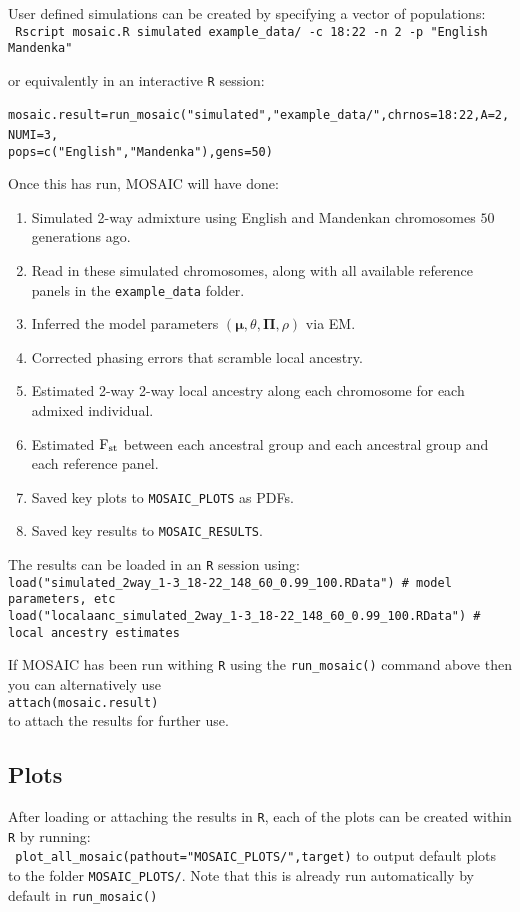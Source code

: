 \documentclass{article}
\begin{document}
User defined simulations can be created by specifying a vector of populations:\\
\verb+ Rscript mosaic.R simulated example_data/ -c 18:22 -n 2 -p "English Mandenka"+

or equivalently in an interactive \texttt{R} session:\\
\verb+ mosaic.result=run_mosaic("simulated","example_data/",chrnos=18:22,A=2,NUMI=3,+
\verb+                                pops=c("English","Mandenka"),gens=50) +

Once this has run, MOSAIC will have done:
\begin{enumerate}
  \item Simulated 2-way admixture using English and Mandenkan chromosomes $50$ generations ago.
  \item Read in these simulated chromosomes, along with all available reference panels in the \texttt{example\_data} folder.
  \item Inferred the model parameters $(\bm\mu, \theta, \bm\Pi, \rho)$ via EM.
  \item Corrected phasing errors that scramble local ancestry. 
  \item Estimated 2-way 2-way local ancestry along each chromosome for each admixed individual. 
  \item Estimated $\textrm{F}_{\textrm{st}}$ between each ancestral group and each ancestral group and each reference panel. 
  \item Saved key plots to \texttt{MOSAIC\_PLOTS} as PDFs.
  \item Saved key results to \texttt{MOSAIC\_RESULTS}.
\end{enumerate}
The results can be loaded in an \texttt{R} session using:\\
\verb+load("simulated_2way_1-3_18-22_148_60_0.99_100.RData") # model parameters, etc+  \\
\verb+load("localaanc_simulated_2way_1-3_18-22_148_60_0.99_100.RData") # local ancestry estimates+ 

If MOSAIC has been run withing \texttt{R} using the \verb+run_mosaic()+ command above then you can alternatively use\\
\verb+attach(mosaic.result)+ \\
to attach the results for further use. 

\subsection{Plots}
After loading or attaching the results in \texttt{R}, 
each of the plots can be created within \texttt{R} by running:\\
\verb+ plot_all_mosaic(pathout="MOSAIC_PLOTS/",target)+
to output default plots to the folder \texttt{MOSAIC\_PLOTS/}. 
Note that this is already run automatically by default in \verb+run_mosaic()+
\end{document}
